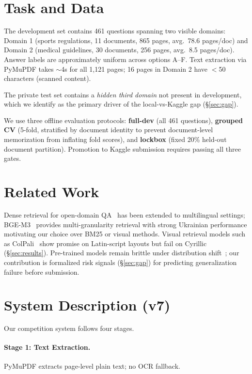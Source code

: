 \documentclass[11pt]{article}
\begin{document}
\section{Task and Data}

The development set contains 461 questions spanning two visible domains: Domain 1 (sports regulations, 11 documents, 865 pages, avg.\ 78.6 pages/doc) and Domain 2 (medical guidelines, 30 documents, 256 pages, avg.\ 8.5 pages/doc). Answer labels are approximately uniform across options A--F. Text extraction via PyMuPDF takes $\sim$4s for all 1,121 pages; 16 pages in Domain 2 have $<$50 characters (scanned content).

The private test set contains a \textit{hidden third domain} not present in development, which we identify as the primary driver of the local-vs-Kaggle gap (\S\ref{sec:gap}).

We use three offline evaluation protocols: \textbf{full-dev} (all 461 questions), \textbf{grouped CV} (5-fold, stratified by document identity to prevent document-level memorization from inflating fold scores), and \textbf{lockbox} (fixed 20\% held-out document partition). Promotion to Kaggle submission requires passing all three gates.

\section{Related Work}
\label{sec:related}

Dense retrieval for open-domain QA~\cite{lewis2020retrieval} has been extended to multilingual settings; BGE-M3~\cite{chen2024bge} provides multi-granularity retrieval with strong Ukrainian performance motivating our choice over BM25 or visual methods. Visual retrieval models such as ColPali~\cite{faysse2024colpali} show promise on Latin-script layouts but fail on Cyrillic (\S\ref{sec:results}). Pre-trained models remain brittle under distribution shift~\cite{hendrycks2020pretrained}; our contribution is formalized risk signals (\S\ref{sec:gap}) for predicting generalization failure before submission.

\section{System Description (v7)}
\label{sec:system}

Our competition system follows four stages.

\paragraph{Stage 1: Text Extraction.}
PyMuPDF extracts page-level plain text; no OCR fallback.
\end{document}
